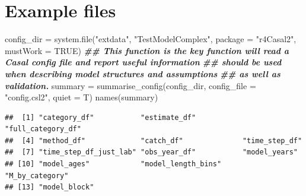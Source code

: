 \documentclass[
]{book}
\newenvironment{Shaded}{\begin{snugshade}}{\end{snugshade}}
\newcommand{\AttributeTok}[1]{\textcolor[rgb]{0.77,0.63,0.00}{#1}}
\newcommand{\ConstantTok}[1]{\textcolor[rgb]{0.00,0.00,0.00}{#1}}
\newcommand{\DocumentationTok}[1]{\textcolor[rgb]{0.56,0.35,0.01}{\textbf{\textit{#1}}}}
\newcommand{\FloatTok}[1]{\textcolor[rgb]{0.00,0.00,0.81}{#1}}
\newcommand{\FunctionTok}[1]{\textcolor[rgb]{0.00,0.00,0.00}{#1}}
\newcommand{\NormalTok}[1]{#1}
\newcommand{\OtherTok}[1]{\textcolor[rgb]{0.56,0.35,0.01}{#1}}
\newcommand{\SpecialCharTok}[1]{\textcolor[rgb]{0.00,0.00,0.00}{#1}}
\newcommand{\StringTok}[1]{\textcolor[rgb]{0.31,0.60,0.02}{#1}}
\begin{document}
\hypertarget{example-files}{%
\section{Example files}\label{example-files}}

\begin{Shaded}
\begin{Highlighting}[]
\NormalTok{config\_dir }\OtherTok{=} \FunctionTok{system.file}\NormalTok{(}\StringTok{"extdata"}\NormalTok{, }\StringTok{"TestModelComplex"}\NormalTok{, }\AttributeTok{package =} \StringTok{"r4Casal2"}\NormalTok{, }\AttributeTok{mustWork =} \ConstantTok{TRUE}\NormalTok{)}
\DocumentationTok{\#\# This function is the key function will read a Casal config file and report useful information}
\DocumentationTok{\#\# should be used when describing model structures and assumptions}
\DocumentationTok{\#\# as well as validation.}
\NormalTok{summary }\OtherTok{=} \FunctionTok{summarise\_config}\NormalTok{(config\_dir, }\AttributeTok{config\_file =} \StringTok{"config.csl2"}\NormalTok{, }\AttributeTok{quiet =}\NormalTok{ T)}
\FunctionTok{names}\NormalTok{(summary)}
\end{Highlighting}
\end{Shaded}

\begin{verbatim}
##  [1] "category_df"           "estimate_df"           "full_category_df"     
##  [4] "method_df"             "catch_df"              "time_step_df"         
##  [7] "time_step_df_just_lab" "obs_year_df"           "model_years"          
## [10] "model_ages"            "model_length_bins"     "M_by_category"        
## [13] "model_block"
\end{verbatim}

\begin{Shaded}
\end{Shaded}
\end{document}
